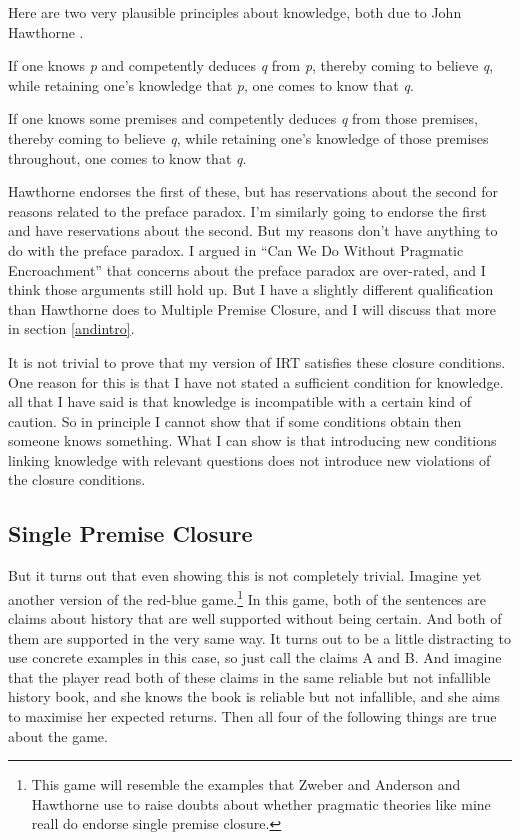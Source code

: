 \documentclass[
  11pt,
]{book}
\providecommand{\tightlist}{%
  \setlength{\itemsep}{0pt}\setlength{\parskip}{0pt}}
\begin{document}
Here are two very plausible principles about knowledge, both due to John Hawthorne \citeyearpar{Hawthorne2005}.

\begin{description}
\tightlist
\item[Single Premise Closure]
If one knows \emph{p} and competently deduces \emph{q} from \emph{p}, thereby coming to believe \emph{q}, while retaining one's knowledge that \emph{p}, one comes to know that \emph{q}. \citep[43]{Hawthorne2005}
\item[Multiple Premise Closure]
If one knows some premises and competently deduces \emph{q} from those premises, thereby coming to believe \emph{q}, while retaining one's knowledge of those premises throughout, one comes to know that \emph{q}. \citep[43]{Hawthorne2005}
\end{description}

Hawthorne endorses the first of these, but has reservations about the second for reasons related to the preface paradox. I'm similarly going to endorse the first and have reservations about the second. But my reasons don't have anything to do with the preface paradox. I argued in ``Can We Do Without Pragmatic Encroachment'' \citep{Weatherson2005-WEACWD} that concerns about the preface paradox are over-rated, and I think those arguments still hold up. But I have a slightly different qualification than Hawthorne does to Multiple Premise Closure, and I will discuss that more in section \ref{andintro}.

It is not trivial to prove that my version of IRT satisfies these closure conditions. One reason for this is that I have not stated a sufficient condition for knowledge. all that I have said is that knowledge is incompatible with a certain kind of caution. So in principle I cannot show that if some conditions obtain then someone knows something. What I can show is that introducing new conditions linking knowledge with relevant questions does not introduce new violations of the closure conditions.

\hypertarget{andelim}{%
\subsection{Single Premise Closure}\label{andelim}}

But it turns out that even showing this is not completely trivial. Imagine yet another version of the red-blue game.\footnote{This game will resemble the examples that Zweber \citeyearpar{Zweber2016} and Anderson and Hawthorne \citeyearpar{AndersonHawthorne2019b} use to raise doubts about whether pragmatic theories like mine reall do endorse single premise closure.} In this game, both of the sentences are claims about history that are well supported without being certain. And both of them are supported in the very same way. It turns out to be a little distracting to use concrete examples in this case, so just call the claims A and B. And imagine that the player read both of these claims in the same reliable but not infallible history book, and she knows the book is reliable but not infallible, and she aims to maximise her expected returns. Then all four of the following things are true about the game.
\end{document}
